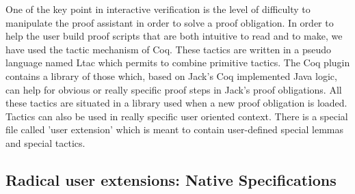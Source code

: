 One of the key point in interactive verification is the level of difficulty
to manipulate the proof assistant in order to solve a proof obligation.
In order to help the user build proof scripts that are both intuitive
to read and to make, we have used the tactic mechanism of Coq.
These tactics are written in a pseudo language named Ltac \cite{DEL-00-LTAC}
which permits to combine primitive tactics.
The Coq plugin contains a library of those which, based on Jack's Coq 
implemented Java logic, can help for obvious or really specific proof steps
in Jack's proof obligations. All these tactics are situated in a library 
used when a new proof obligation is loaded. Tactics can also be used in 
really specific user oriented context. There is a special file called 
'user extension' which is meant to contain user-defined
special lemmas and special tactics.



\subsection{Radical user extensions: Native Specifications}



